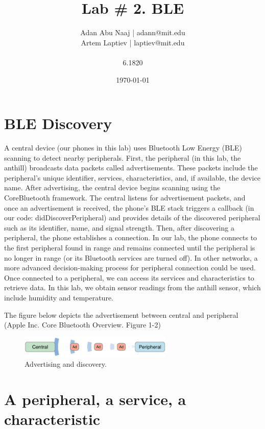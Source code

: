 \documentclass{lab}
\title{Lab \# 2. BLE} %
\author{Adan Abu Naaj | adann@mit.edu \\ Artem Laptiev | laptiev@mit.edu \\\\ 6.1820} %
\date{\today} %
\begin{document}
\maketitle

\newpage

\section{BLE Discovery}

A central device (our phones in this lab) uses Bluetooth Low Energy (BLE) scanning to detect nearby peripherals. First, the peripheral (in this lab, the anthill) broadcasts data packets called advertisements. These packets include the peripheral's unique identifier, services, characteristics, and, if available, the device name.
After advertising, the central device begins scanning using the CoreBluetooth framework. The central listens for advertisement packets, and once an advertisement is received, the phone’s BLE stack triggers a callback (in our code: didDiscoverPeripheral) and provides details of the discovered peripheral such as its identifier, name, and signal strength.
Then, after discovering a peripheral, the phone establishes a connection. In our lab, the phone connects to the first peripheral found in range and remains connected until the peripheral is no longer in range (or its Bluetooth services are turned off). In other networks, a more advanced decision-making process for peripheral connection could be used.
Once connected to a peripheral, we can access its services and characteristics to retrieve data. In this lab, we obtain sensor readings from the anthill sensor, which include humidity and temperature.

The figure below depicts the advertisement between central and peripheral (Apple Inc. Core Bluetooth Overview. Figure 1-2)


\begin{figure}[h]
    \begin{center}
    \includegraphics[width=0.65\textwidth]{images/AdvertisingAndDiscovery.png} 
    \caption{Advertising and discovery.}
    \end{center}
\end{figure}


\section{A peripheral, a service, a characteristic}
\end{document}
